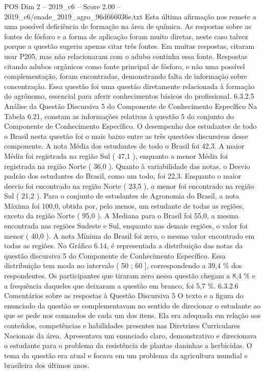 \begin{textsample}{POS Dim 2 – 2019\_c6 – Score 2.00 – 2019\_c6/enade\_2019\_agro\_96d666036e.txt}
Esta última afirmação nos remete a uma possível deficiência de formação na área de química.
As respostas sobre as fontes de fósforo e a forma de aplicação foram muito diretas, neste caso talvez porque a questão sugeriu apenas citar três fontes.
Em muitas respostas, citaram usar P205, mas não relacionaram com o adubo continha essa fonte.
Respostas citando adubos orgânicos como fonte principal de fósforo, e não uma possível complementação, foram encontradas, demonstrando falta de informação sobre concentração.
Essa questão foi uma questão diretamente relacionada à formação do agrônomo, essencial para aferir conhecimentos básicos do profissional. 6.3.2.5 Análise da Questão Discursiva 5 do Componente de Conhecimento Específico Na Tabela 6.21, constam as informações relativas à questão 5 do conjunto do Componente de Conhecimento Específico.
O desempenho dos estudantes de todo o Brasil nesta questão foi o mais baixo entre as três questões discursivas desse componente.
A nota Média dos estudantes de todo o Brasil foi 42,3.
A maior Média foi registrada na região Sul ( 47,1 ), enquanto a menor Média foi registrada na região Norte ( 36,0 ).
Quanto à variabilidade das notas, o Desvio padrão dos estudantes do Brasil, como um todo, foi 22,3.
Enquanto o maior desvio foi encontrado na região Norte ( 23,5 ), o menor foi encontrado na região Sul ( 21,2 ).
Para o conjunto de estudantes de Agronomia do Brasil, a nota Máxima foi 100,0, obtida por, pelo menos, um estudante de todas as regiões, exceto da região Norte ( 95,0 ).
A Mediana para o Brasil foi 55,0, a mesma encontrada nas regiões Sudeste e Sul, enquanto nas demais regiões, o valor foi menor ( 40,0 ).
A nota Mínima do Brasil foi zero, o mesmo valor encontrado em todas as regiões.
No Gráfico 6.14, é representada a distribuição das notas da questão discursiva 5 do Componente de Conhecimento Específico.
Essa distribuição tem moda no intervalo ( 50 ; 60 ], correspondendo a 39,4 \% dos respondentes.
Os participantes que tiraram zero nessa questão chegam a 8,4 \% e a frequência daqueles que deixaram a questão em branco, foi 5,7 \%. 6.3.2.6 Comentários sobre as respostas à Questão Discursiva 5 O texto e a figura do enunciado da questão se complementavam no sentido de direcionar o estudante ao que se pede nos comandos de cada um dos itens.
Ela era adequada em relação aos conteúdos, competências e habilidades presentes nas Diretrizes Curriculares Nacionais da área.
Apresentava um enunciado claro, demonstrativo e direcionava o estudante para o problema da resistência de plantas daninhas a herbicidas.
O tema da questão era atual e focava em um problema da agricultura mundial e brasileira dos últimos anos.

\end{textsample}
